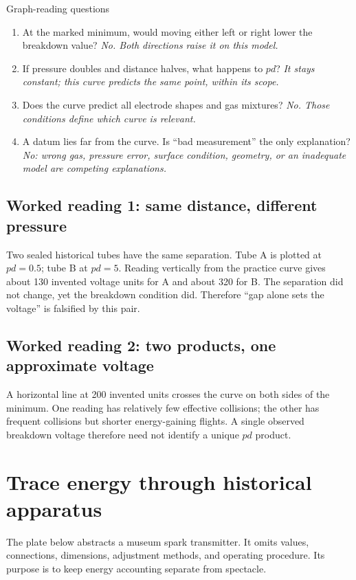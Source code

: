 \begin{teloscard}{Graph-reading questions}
\begin{enumerate}[leftmargin=*,itemsep=.35em]
\item At the marked minimum, would moving either left or right lower the
breakdown value? \emph{No. Both directions raise it on this model.}
\item If pressure doubles and distance halves, what happens to \(pd\)?
\emph{It stays constant; this curve predicts the same point, within its scope.}
\item Does the curve predict all electrode shapes and gas mixtures?
\emph{No. Those conditions define which curve is relevant.}
\item A datum lies far from the curve. Is ``bad measurement'' the only
explanation? \emph{No: wrong gas, pressure error, surface condition, geometry,
or an inadequate model are competing explanations.}
\end{enumerate}
\end{teloscard}

\subsection{Worked reading 1: same distance, different pressure}
Two sealed historical tubes have the same separation. Tube A is plotted at
\(pd=0.5\); tube B at \(pd=5\). Reading vertically from the practice curve gives
about 130 invented voltage units for A and about 320 for B. The separation did
not change, yet the breakdown condition did. Therefore ``gap alone sets the
voltage'' is falsified by this pair.

\subsection{Worked reading 2: two products, one approximate voltage}
A horizontal line at 200 invented units crosses the curve on both sides of the
minimum. One reading has relatively few effective collisions; the other has
frequent collisions but shorter energy-gaining flights. A single observed
breakdown voltage therefore need not identify a unique \(pd\) product.

\section{Trace energy through historical apparatus}

The plate below abstracts a museum spark transmitter. It omits values,
connections, dimensions, adjustment methods, and operating procedure. Its
purpose is to keep energy accounting separate from spectacle.

